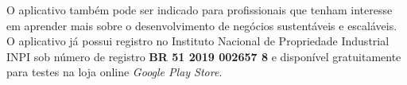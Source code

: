 O aplicativo também pode ser indicado para profissionais que tenham interesse em aprender mais sobre o desenvolvimento de negócios sustentáveis e escaláveis. O aplicativo já possui registro no Instituto Nacional de Propriedade Industrial INPI sob número de registro \textbf{BR 51 2019 002657 8} e disponível gratuitamente para testes na loja online \textit{Google Play Store}.

